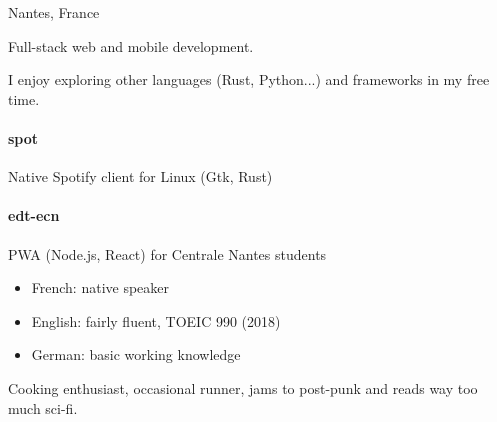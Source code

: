 \documentclass{cv}
\begin{document}
\hfill
\begin{minipage}[t]{0.28\textwidth}%


	 Nantes, France
	\newline{} %
	\newline{} \href{mailto:%
	}{\link{%
	}}%
	\newline{} \href{https://github.com/xou816}{} 


	Full-stack web and mobile development.

	\begin{center}
		   
		  
		 
		  
	\end{center}

	\raggedright
	I enjoy exploring other languages (Rust, Python...) and frameworks in my free time.
	\paragraph{spot} Native Spotify client for Linux (Gtk, Rust)
	\paragraph{edt-ecn} PWA (Node.js, React) for Centrale Nantes students


	\begin{itemize}
	\setlength\itemsep{0pt}
	\item French: native speaker
	\item English: fairly fluent, TOEIC 990 (2018)
	\item German: basic working knowledge
	\end{itemize}


	Cooking enthusiast, occasional runner, jams to post-punk and reads way too much sci-fi. 
		
\end{minipage}
\end{document}
